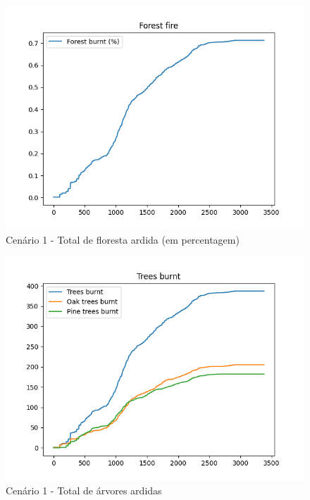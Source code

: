 \begin{figure}[H]
    \includegraphics[width=\linewidth]{src/runs/scenario1/forest_fire.png}
    \caption{Cenário 1 - Total de floresta ardida (em percentagem)}
    \label{fig:S1ForestBurnt}        
\end{figure}
    
\begin{figure}[H]
    \centering
    \includegraphics[width=\linewidth]{src/runs/scenario1/trees_burnt.png}
    \caption{Cenário 1 - Total de árvores ardidas}
    \label{fig:S1TreesBurnt}
\end{figure}

